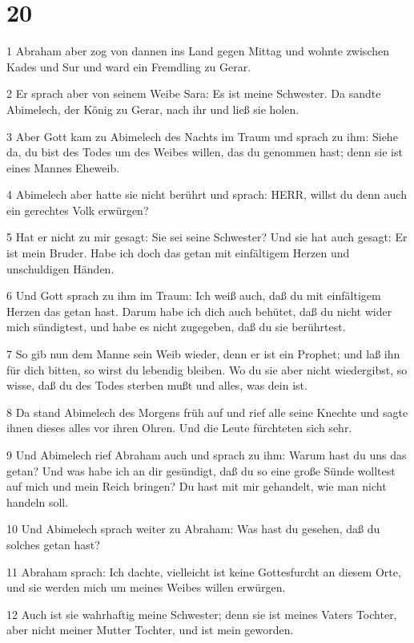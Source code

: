 \chapter{20}

\par 1 Abraham aber zog von dannen ins Land gegen Mittag und wohnte zwischen Kades und Sur und ward ein Fremdling zu Gerar.
\par 2 Er sprach aber von seinem Weibe Sara: Es ist meine Schwester. Da sandte Abimelech, der König zu Gerar, nach ihr und ließ sie holen.
\par 3 Aber Gott kam zu Abimelech des Nachts im Traum und sprach zu ihm: Siehe da, du bist des Todes um des Weibes willen, das du genommen hast; denn sie ist eines Mannes Eheweib.
\par 4 Abimelech aber hatte sie nicht berührt und sprach: HERR, willst du denn auch ein gerechtes Volk erwürgen?
\par 5 Hat er nicht zu mir gesagt: Sie sei seine Schwester? Und sie hat auch gesagt: Er ist mein Bruder. Habe ich doch das getan mit einfältigem Herzen und unschuldigen Händen.
\par 6 Und Gott sprach zu ihm im Traum: Ich weiß auch, daß du mit einfältigem Herzen das getan hast. Darum habe ich dich auch behütet, daß du nicht wider mich sündigtest, und habe es nicht zugegeben, daß du sie berührtest.
\par 7 So gib nun dem Manne sein Weib wieder, denn er ist ein Prophet; und laß ihn für dich bitten, so wirst du lebendig bleiben. Wo du sie aber nicht wiedergibst, so wisse, daß du des Todes sterben mußt und alles, was dein ist.
\par 8 Da stand Abimelech des Morgens früh auf und rief alle seine Knechte und sagte ihnen dieses alles vor ihren Ohren. Und die Leute fürchteten sich sehr.
\par 9 Und Abimelech rief Abraham auch und sprach zu ihm: Warum hast du uns das getan? Und was habe ich an dir gesündigt, daß du so eine große Sünde wolltest auf mich und mein Reich bringen? Du hast mit mir gehandelt, wie man nicht handeln soll.
\par 10 Und Abimelech sprach weiter zu Abraham: Was hast du gesehen, daß du solches getan hast?
\par 11 Abraham sprach: Ich dachte, vielleicht ist keine Gottesfurcht an diesem Orte, und sie werden mich um meines Weibes willen erwürgen.
\par 12 Auch ist sie wahrhaftig meine Schwester; denn sie ist meines Vaters Tochter, aber nicht meiner Mutter Tochter, und ist mein geworden.

